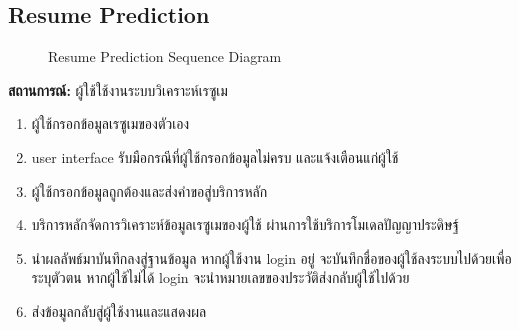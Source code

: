 \subsection{Resume Prediction}
\begin{figure}[H]\centering
    \setlength{\fboxrule}{0.2mm} %
    \caption{Resume Prediction Sequence Diagram}\label{fig:resumePredictSeqDiagram}
\end{figure}
\textbf{สถานการณ์: }ผู้ใช้ใช้งานระบบวิเคราะห์เรซูเม
\begin{enumerate}
    \item ผู้ใช้กรอกข้อมูลเรซูเมของตัวเอง
    \item user interface รับมือกรณีที่ผู้ใช้กรอกข้อมูลไม่ครบ และแจ้งเตือนแก่ผู้ใช้
    \item ผู้ใช้กรอกข้อมูลถูกต้องและส่งคำขอสู่บริการหลัก
    \item บริการหลักจัดการวิเคราะห์ข้อมูลเรซูเมของผู้ใช้ ผ่านการใช้บริการโมเดลปัญญาประดิษฐ์
    \item นำผลลัพธ์มาบันทึกลงสู่ฐานข้อมูล หากผู้ใช้งาน login อยู่ จะบันทึกชื่อของผู้ใช้ลงระบบไปด้วยเพื่อระบุตัวตน หากผู้ใช้ไม่ได้ login จะนำหมายเลขของประวัติส่งกลับผู้ใช้ไปด้วย
    \item ส่งข้อมูลกลับสู่ผู้ใช้งานและแสดงผล
\end{enumerate}

